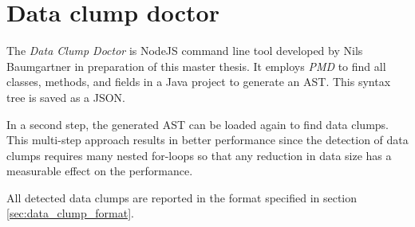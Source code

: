 \section{Data clump doctor} \label{sec:data_clump_doctor}

The  \textit{Data Clump Doctor} is NodeJS command line tool developed by Nils Baumgartner in preparation of this master thesis. It employs \textit{PMD} to find all classes, methods, and fields in a Java project to generate an \ac{AST}. This syntax tree is saved as a \ac{JSON}. 

In a second step, the generated \ac{AST} can be loaded again to find data clumps. This multi-step approach results in better performance since the detection of data clumps requires many nested for-loops so that any reduction in data size has a measurable effect on the performance.

All detected data clumps are reported in the format specified in section \ref{sec:data_clump_format}.



